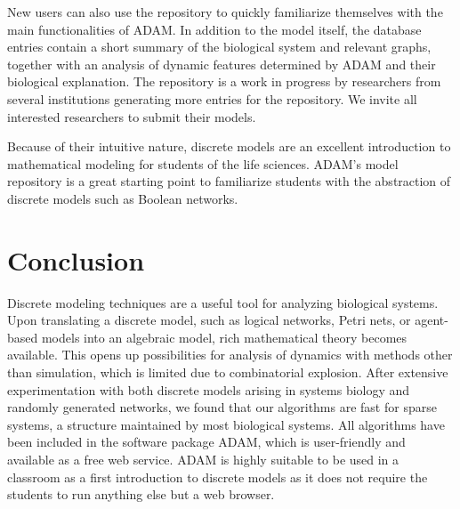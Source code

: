\documentclass[10pt]{bmc_article}
\begin{document}
New users can also use the repository to quickly familiarize themselves with the main functionalities of ADAM. In addition to the model itself, the database entries contain a short summary of the biological system and relevant graphs, together with an analysis of dynamic features determined by ADAM and their biological explanation. The repository is a work in progress by researchers from several institutions generating more entries for the repository.  We invite all interested researchers to submit their models.


Because of their intuitive nature, discrete models are an excellent introduction to mathematical modeling for students of the life sciences. ADAM's model repository is a great starting point to familiarize students with the abstraction of discrete models such as Boolean networks.
\section{Conclusion}
Discrete modeling techniques are a useful tool for analyzing biological
systems. Upon translating a discrete model, such as logical networks,
Petri nets, or agent-based models into an algebraic model, rich mathematical
theory becomes available. This opens up possibilities for analysis of dynamics with methods other than
simulation, which is limited due to combinatorial explosion. After extensive experimentation with both discrete models arising in systems biology and randomly generated networks, we found that our algorithms
are fast for sparse systems, a structure maintained by most biological
systems. All algorithms have been included in the software package ADAM\cite{ADAM},
which is user-friendly and available as a free web service.
ADAM is highly suitable to be used in a classroom as a first
introduction to discrete models as it does not require the students to run
anything else but a web browser.
\end{document}
